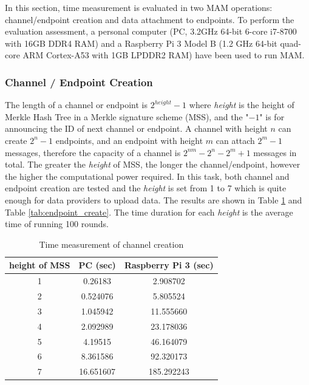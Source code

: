 \documentclass[conference]{IEEEtran}
\begin{document}
In this section, time measurement is evaluated in two MAM operations: channel/endpoint creation and data attachment to endpoints. To perform the evaluation assessment, a personal computer (PC, 3.2GHz 64-bit 6-core i7-8700 with 16GB DDR4 RAM) and a Raspberry Pi 3 Model B (1.2 GHz 64-bit quad-core ARM Cortex-A53 with 1GB LPDDR2 RAM) have been used to run MAM. 

\subsubsection{Channel / Endpoint Creation}
The length of a channel or endpoint is $2^{height}-1$ where \textit{height} is the height of Merkle Hash Tree in a Merkle signature scheme (MSS), and the "$-1$" is for announcing the ID of next channel or endpoint. A channel with height $n$ can create $2^n-1$ endpoints, and an endpoint with height $m$ can attach $2^m-1$ messages, therefore the capacity of a channel is $2^{nm}-2^n-2^m+1$ messages in total. The greater the \textit{height} of MSS, the longer the channel/endpoint, however the higher the computational power required. In this task, both channel and endpoint creation are tested and the \textit{height} is set from 1 to 7 which is quite enough for data providers to upload data. The results are shown in Table \ref{tab:channel_create} and Table \ref{tab:endpoint_create}. The time duration for each \textit{height} is the average time of running 100 rounds.

\begin{table}[htbp]
	\caption{Time measurement of channel creation}
	\label{tab:channel_create}
	\begin{center}
	\begin{tabular}{|c|c|c|}
	\hline
		\textbf{height of MSS} & \textbf{PC (sec)} & \textbf{Raspberry Pi 3 (sec)} \\ 
		\hline
		1 & 0.26183 & 2.908702 \\ 
		2 & 0.524076 & 5.805524 \\ 
		3 & 1.045942 & 11.555660 \\ 
		4 & 2.092989 & 23.178036 \\ 
		5 & 4.19515 & 46.164079\\ 
		6 & 8.361586 & 92.320173\\ 
		7 & 16.651607 & 185.292243\\
		\hline
	\end{tabular}
	\end{center}
\end{table}
\end{document}
